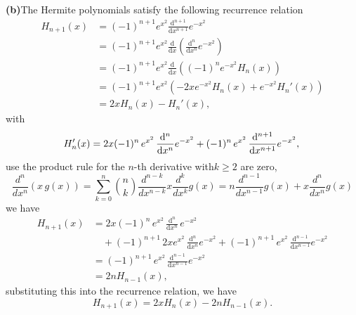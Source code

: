 \documentclass[12pt]{article}
\begin{document}
\noindent\textbf{(b)}\quad The Hermite polynomials satisfy the following recurrence relation
\begin{equation}
\begin{aligned}
    H_{n+1}(x) &= (-1)^{n+1} e^{x^2} \frac{\mathrm{d}^{n+1}}{\mathrm{d}x^{n+1}} e^{-x^2}\\
    &= (-1)^{n+1} e^{x^2} \frac{\mathrm{d}}{\mathrm{d}x} \left( \frac{\mathrm{d}^{n}}{\mathrm{d}x^{n}} e^{-x^2} \right)\\
    &= (-1)^{n+1} e^{x^2} \frac{\mathrm{d}}{\mathrm{d}x} \left( (-1)^n e^{-x^2} H_n(x) \right)\\
    &= (-1)^{n+1} e^{x^2} \left( -2x e^{-x^2} H_n(x) + e^{-x^2} H_n'(x) \right)\\
    &= 2x H_n(x) - H_n'(x),
\end{aligned}
\end{equation}
with
\begin{equation}
    H_n'(x) = 2x (-1)^n \,e^{x^2}\, \frac{\mathrm{d}^n}{\mathrm{d}x^n} e^{-x^2} + (-1)^n \,e^{x^2}\, \frac{\mathrm{d}^{n+1}}{\mathrm{d}x^{n+1}} e^{-x^2},\\
\end{equation}
use the product rule for the $n$-th derivative with$k \geq 2$ are zero,
\begin{equation}
    \frac{d^n}{dx^n} (x\,g(x)) = \sum_{k=0}^{n} \binom{n}{k} \frac{d^{n-k}}{dx^{n-k}} x \frac{d^k}{dx^k} g(x) = n \frac{d^{n-1}}{dx^{n-1}} g(x) + x \frac{d^n}{dx^n} g(x)
\end{equation}
we have
\begin{equation}
\begin{aligned}
    H_{n+1}(x)&=2x(-1)^n\,e^{x^2}\,\frac{\mathrm{d}^n}{\mathrm{d}x^n}\,e^{-x^2} \\
    &\quad + (-1)^{n+1}\, 2x e^{x^2}\, \frac{\mathrm{d}^n}{\mathrm{d}x^n} e^{-x^2} + (-1)^{n+1}\, e^{x^2}\, \frac{\mathrm{d}^{n-1}}{\mathrm{d}x^{n-1}} e^{-x^2}\\
    &= (-1)^{n+1}\, e^{x^2}\, \frac{\mathrm{d}^{n-1}}{\mathrm{d}x^{n-1}} e^{-x^2}\\
    &= 2n H_{n-1}(x),
\end{aligned}
\end{equation}
substituting this into the recurrence relation, we have
\begin{equation}
    H_{n+1}(x) = 2x H_n(x) - 2n H_{n-1}(x).
\end{equation}
\end{document}
